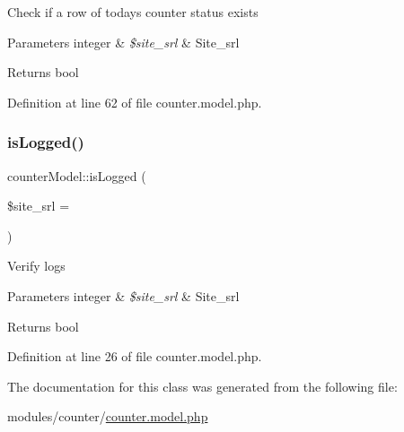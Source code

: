 Check if a row of today\textquotesingle{}s counter status exists


\begin{DoxyParams}[1]{Parameters}
integer & {\em \$site\+\_\+srl} & Site\+\_\+srl \\
\hline
\end{DoxyParams}
\begin{DoxyReturn}{Returns}
bool 
\end{DoxyReturn}


Definition at line 62 of file counter.\+model.\+php.

\hypertarget{classcounterModel_a8d9351da08e33d6f47f8645d87ec9380}{}\label{classcounterModel_a8d9351da08e33d6f47f8645d87ec9380} 
\subsubsection{\texorpdfstring{is\+Logged()}{isLogged()}}
{\footnotesize\ttfamily counter\+Model\+::is\+Logged (\begin{DoxyParamCaption}\item[{}]{\$site\+\_\+srl = {} }\end{DoxyParamCaption})}

Verify logs


\begin{DoxyParams}[1]{Parameters}
integer & {\em \$site\+\_\+srl} & Site\+\_\+srl \\
\hline
\end{DoxyParams}
\begin{DoxyReturn}{Returns}
bool 
\end{DoxyReturn}


Definition at line 26 of file counter.\+model.\+php.



The documentation for this class was generated from the following file\+:\begin{DoxyCompactItemize}
\item 
modules/counter/\hyperlink{counter_8model_8php}{counter.\+model.\+php}\end{DoxyCompactItemize}
